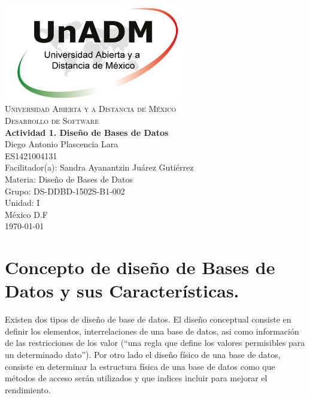 \documentclass[spanish,12pt,letterpapper]{article}
\begin{document}
	\begin{titlepage}
		\begin{center}
			\includegraphics[width=0.6\textwidth]{./logoUnADM}~\\[1cm] 
			\textsc{Universidad Abierta y a Distancia de México}\\[0.8cm]
			\textsc{Desarrollo de Software}\\[1.8cm]
			
			\textbf{ \Large Actividad 1. Diseño de Bases de Datos  }\\[3cm]
			
			Diego Antonio Plascencia Lara\\ ES1421004131 \\[0.4cm]
			Facilitador(a): Sandra Ayanantzin Juárez Gutiérrez  \\
			Materia: Diseño de Bases de Datos\\
			Grupo: DS-DDBD-1502S-B1-002 \\
			Unidad: I \\
			
			\vfill México D.F\\{\today}
			
		\end{center}
	\end{titlepage}
	
	\section{Concepto de diseño de Bases de Datos y sus Características.\\}
	Existen dos tipos de diseño de base de datos. El diseño conceptual consiste en definir los elementos, interrelaciones de una base de datos, asi como información de las restricciones de los valor (``una regla que define los valores permisibles para un determinado dato''). Por otro lado el diseño físico de una base de datos, consiste en determinar la estructura física de una base de datos como que métodos de acceso serán utilizados y que indices incluir para mejorar el rendimiento. \\
	
\end{document}
